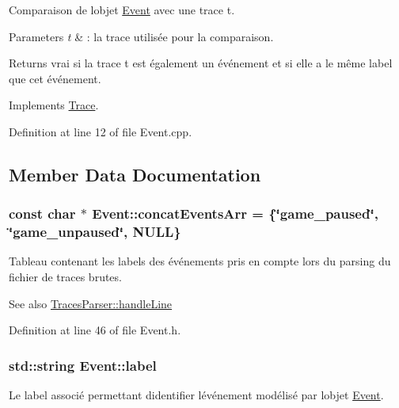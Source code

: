 Comparaison de l\textquotesingle{}objet \hyperlink{class_event}{Event} avec une trace {\ttfamily t}. 


\begin{DoxyParams}{Parameters}
{\em t} & \+: la trace utilisée pour la comparaison.\\
\hline
\end{DoxyParams}
\begin{DoxyReturn}{Returns}
vrai si la trace {\ttfamily t} est également un événement et si elle a le même label que cet événement. 
\end{DoxyReturn}


Implements \hyperlink{class_trace_a8201809c2fcc1d02cfa8bf894a79bb5e}{Trace}.



Definition at line 12 of file Event.\+cpp.



\subsection{Member Data Documentation}
\subsubsection[{\texorpdfstring{concat\+Events\+Arr}{concatEventsArr}}]{\setlength{\rightskip}{0pt plus 5cm}const char $\ast$ Event\+::concat\+Events\+Arr = \{\char`\"{}game\+\_\+paused\char`\"{}, \char`\"{}game\+\_\+unpaused\char`\"{}, N\+U\+LL\}\hspace{0.3cm}{\ttfamily [static]}}\hypertarget{class_event_a27d769cc30bbd8d827124958a9a95cae}{}\label{class_event_a27d769cc30bbd8d827124958a9a95cae}
Tableau contenant les labels des événements pris en compte lors du parsing du fichier de traces brutes.

\begin{DoxySeeAlso}{See also}
\hyperlink{class_traces_parser_af094e480d2d92e273ec454cc8bdb4c56}{Traces\+Parser\+::handle\+Line} 
\end{DoxySeeAlso}


Definition at line 46 of file Event.\+h.

\subsubsection[{\texorpdfstring{label}{label}}]{\setlength{\rightskip}{0pt plus 5cm}std\+::string Event\+::label\hspace{0.3cm}{\ttfamily [protected]}}\hypertarget{class_event_a8d9ecffd91cc944bee314f83260713ff}{}\label{class_event_a8d9ecffd91cc944bee314f83260713ff}
Le label associé permettant d\textquotesingle{}identifier l\textquotesingle{}événement modélisé par l\textquotesingle{}objet \hyperlink{class_event}{Event}. 

